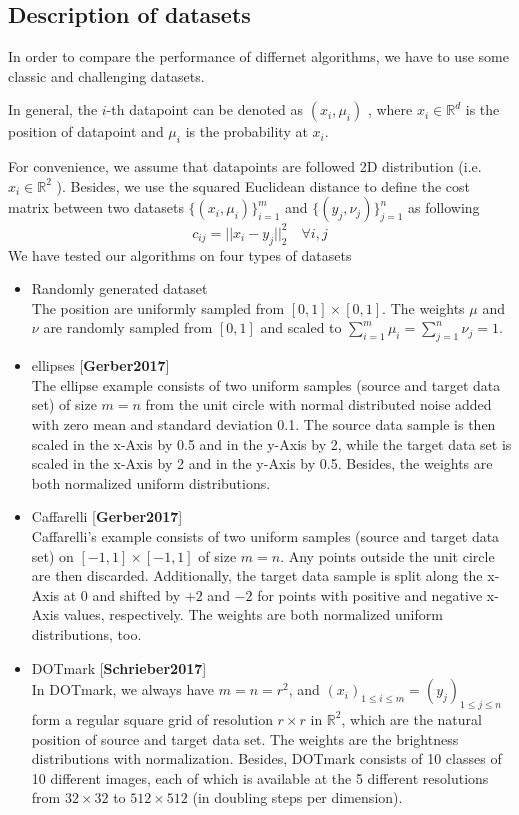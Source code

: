 \documentclass{article}
\begin{document}
\subsection{Description of datasets}
In order to compare the performance of differnet algorithms, we have to use some classic and challenging datasets.

In general, the $i$-th datapoint can be denoted as $(x_{i},\mu_{i})$ , where $x_{i}\in \mathbb{R}^{d}$ is the position of datapoint and $\mu_{i}$ is the probability at $x_{i}$.

For convenience, we assume that datapoints are followed 2D distribution (i.e. $x_{i}\in \mathbb{R}^{2}$ ). Besides, we use the squared Euclidean distance to define the cost matrix between two datasets $\{(x_{i},\mu_{i})\}_{i=1}^{m}$ and $\{(y_{j},\nu_{j})\}_{j=1}^{n}$ as following
\begin{equation}
  c_{ij}=||x_{i}-y_{j}||_{2}^{2}\quad\forall i, j
\end{equation}
We have tested our algorithms on four types of datasets
\begin{itemize}
  \item Randomly generated dataset\\
        The position are uniformly sampled from
        $[0, 1]\times[0, 1]$. The weights $\mu$ and $\nu$ are randomly sampled from $[0, 1]$ and scaled to $ \sum_{i=1}^{m}{\mu_i} = \sum_{j=1}^{n}{\nu_j} = 1 $.
  \item ellipses [\textbf{Gerber2017}]\\
  The ellipse example consists of two uniform samples (source and target data set) of size $m=n$ from the unit circle
  with normal distributed noise added with zero mean and standard deviation 0.1. The source
  data sample is then scaled in the x-Axis by 0.5 and in the y-Axis by 2, while the target
  data set is scaled in the x-Axis by 2 and in the y-Axis by 0.5.
  Besides, the weights are both normalized uniform distributions.
  \item Caffarelli [\textbf{Gerber2017}]\\
  Caffarelli’s example consists of two uniform samples (source and target data set) on $[-1, 1]\times[-1, 1]$  of size $m=n$. Any points outside the unit circle are then
discarded. Additionally, the target data sample is split along the x-Axis at 0 and shifted by
$+2$ and $-2$ for points with positive and negative x-Axis values, respectively. The weights are both normalized uniform distributions, too.
  \item DOTmark [\textbf{Schrieber2017}]\\
  In DOTmark, we always have $m=n=r^{2}$, and $(x_i)_{1\leq i\leq m} = (y_j)_{1\leq j\leq n}$ form a regular square grid of resolution $r\times r$ in $\mathbb{R}^{2}$, which are the natural position of source and target data set. The weights are the brightness distributions with normalization. Besides, DOTmark consists of 10 classes of 10 different
  images, each of which is available at the 5 different
  resolutions from $32\times32$ to $512\times512$ (in doubling steps per dimension).
\end{itemize}
\end{document}
